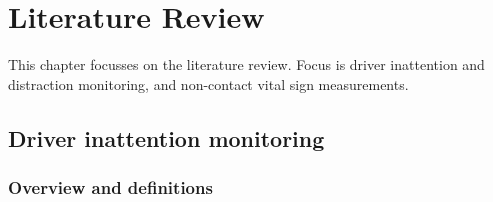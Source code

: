 \documentclass[11pt, parskip=half*,twoside=false]{scrbook}
\begin{document}


\chapter{Literature Review} \label{ch:litreview}
This chapter focusses on the literature review. Focus is driver inattention and distraction monitoring, and non-contact vital sign measurements. 

\section{Driver inattention monitoring} \label{sec:distraction}

\subsection{Overview and definitions} \label{ssec:overview}
%
\end{document}
